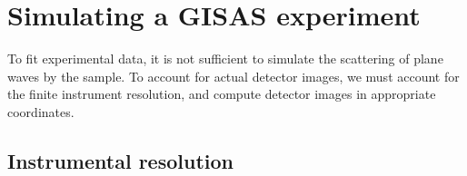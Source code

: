 
\chapter{Simulating a GISAS experiment}  \label{sec:Exp}

To fit experimental data, it is not sufficient to simulate
the scattering of plane waves by the sample.
To account for actual detector images,
we must account for the finite instrument resolution,
and compute detector images in appropriate coordinates.

\section{Instrumental resolution}\label{Sresolution}

\MissingSection



\MissingSection

